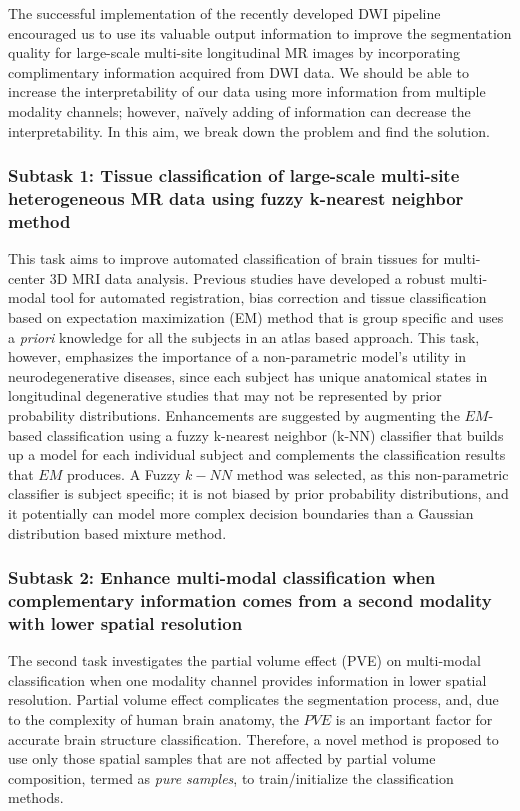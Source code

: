 The successful implementation of the recently developed DWI pipeline encouraged us to use its valuable output information to improve the segmentation quality for large-scale multi-site longitudinal MR images by incorporating complimentary information acquired from DWI data.
We should be able to increase the interpretability of our data using more information from multiple modality channels; however, na\"{i}vely adding of information can decrease the interpretability. In this aim, we break down the problem and find the solution.
\newline

\subsubsection{Subtask 1: Tissue classification of large-scale multi-site heterogeneous MR data using fuzzy k-nearest neighbor method}

This task aims to improve automated classification of brain tissues for multi-center 3D MRI data analysis. 
Previous studies have developed a robust multi-modal tool for automated registration, bias correction and tissue classification based on expectation maximization (EM) method \cite{Kim2013} that is group specific and uses a \emph{priori} knowledge for all the subjects in an atlas based approach.
This task, however, emphasizes the importance of a non-parametric model's utility in neurodegenerative diseases, since each subject has unique anatomical states in longitudinal degenerative studies that may not be represented by prior probability distributions. Enhancements are suggested by augmenting the $EM$-based classification using a fuzzy k-nearest neighbor (k-NN) classifier that builds up a model for each individual subject and complements the classification results that $EM$ produces.
A Fuzzy $k-NN$ method was selected, as this non-parametric classifier is subject specific; it is not biased by prior probability distributions, and it potentially can model more complex decision boundaries than a Gaussian distribution based mixture method.
\newline

\subsubsection{Subtask 2: Enhance multi-modal classification when complementary information comes from a second modality with lower spatial resolution}

The second task investigates the partial volume effect (PVE) on multi-modal classification when one modality channel provides information in lower spatial resolution. Partial volume effect complicates the segmentation process, and, due to the complexity of human brain anatomy, the $PVE$ is an important factor for accurate brain structure classification. Therefore, a novel method is proposed to use only those spatial samples that are not affected by partial volume composition, termed as \textit{pure samples}, to train/initialize the classification methods.
\newline

